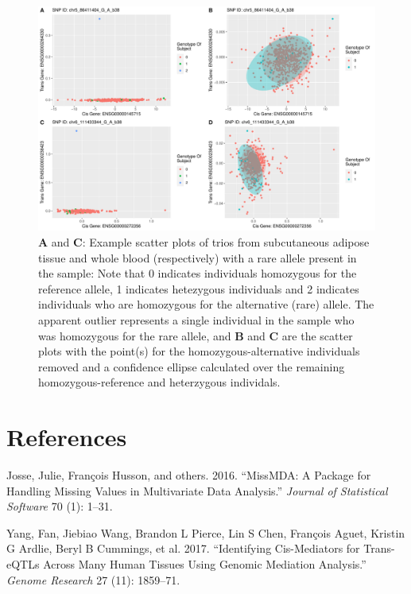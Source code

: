 \documentclass[
]{article}
\begin{document}
\begin{figure}
\centering
\includegraphics{GMACwriteup_files/figure-latex/unnamed-chunk-15-1.pdf}
\caption{\textbf{A} and \textbf{C}: Example scatter plots of trios from
subcutaneous adipose tissue and whole blood (respectively) with a rare
allele present in the sample: Note that 0 indicates individuals
homozygous for the reference allele, 1 indicates hetezygous individuals
and 2 indicates individuals who are homozygous for the alternative
(rare) allele. The apparent outlier represents a single individual in
the sample who was homozygous for the rare allele, and \textbf{B} and
\textbf{C} are the scatter plots with the point(s) for the
homozygous-alternative individuals removed and a confidence ellipse
calculated over the remaining homozygous-reference and heterzygous
individals.}
\end{figure}

\newpage
\section*{References}

\hypertarget{refs}{}
\leavevmode\hypertarget{ref-josse2016missmda}{}%
Josse, Julie, François Husson, and others. 2016. ``MissMDA: A Package
for Handling Missing Values in Multivariate Data Analysis.''
\emph{Journal of Statistical Software} 70 (1): 1--31.

\leavevmode\hypertarget{ref-yang2017identifying}{}%
Yang, Fan, Jiebiao Wang, Brandon L Pierce, Lin S Chen, François Aguet,
Kristin G Ardlie, Beryl B Cummings, et al. 2017. ``Identifying
Cis-Mediators for Trans-eQTLs Across Many Human Tissues Using Genomic
Mediation Analysis.'' \emph{Genome Research} 27 (11): 1859--71.
\end{document}
